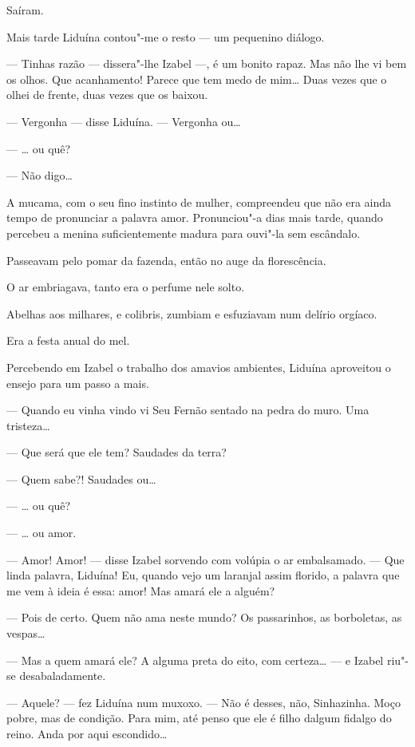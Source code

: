 Saíram.

Mais tarde Liduína contou"-me o resto --- um pequenino diálogo.

--- Tinhas razão --- dissera"-lhe Izabel ---, é um bonito rapaz. Mas não
lhe vi bem os olhos. Que acanhamento! Parece que tem medo de mim\ldots{} Duas
vezes que o olhei de frente, duas vezes que os baixou.

--- Vergonha --- disse Liduína. --- Vergonha ou\ldots{}

--- \ldots{} ou quê?

--- Não digo\ldots{}

A mucama, com o seu fino instinto de mulher, compreendeu que não era
ainda tempo de pronunciar a palavra amor. Pronunciou"-a dias mais tarde,
quando percebeu a menina suficientemente madura para ouvi"-la sem
escândalo.

Passeavam pelo pomar da fazenda, então no auge da florescência.

O ar embriagava, tanto era o perfume nele solto.

Abelhas aos milhares, e colibris, zumbiam e esfuziavam num delírio
orgíaco.

Era a festa anual do mel.

Percebendo em Izabel o trabalho dos amavios ambientes, Liduína
aproveitou o ensejo para um passo a mais.

--- Quando eu vinha vindo vi Seu Fernão sentado na pedra do muro. Uma
tristeza\ldots{}

--- Que será que ele tem? Saudades da terra?

--- Quem sabe?! Saudades ou\ldots{}

--- \ldots{} ou quê?

--- \ldots{} ou amor.

--- Amor! Amor! --- disse Izabel sorvendo com volúpia o ar embalsamado.
--- Que linda palavra, Liduína! Eu, quando vejo um laranjal assim
florido, a palavra que me vem à ideia é essa: amor! Mas amará ele a
alguém?

--- Pois de certo. Quem não ama neste mundo? Os passarinhos, as
borboletas, as vespas\ldots{}

--- Mas a quem amará ele? A alguma preta do eito, com certeza\ldots{} --- e
Izabel riu"-se desabaladamente.

--- Aquele? --- fez Liduína num muxoxo. --- Não é desses, não,
Sinhazinha. Moço pobre, mas de condição. Para mim, até penso que ele é
filho dalgum fidalgo do reino. Anda por aqui escondido\ldots{}

